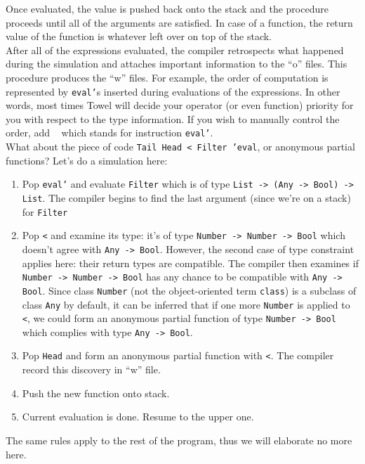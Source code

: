 \documentclass{article}
\begin{document}
Once evaluated, the value is pushed back onto the stack and the procedure proceeds until all of the arguments are satisfied. In case of a function, the return value of the function is whatever left over on top of the stack.\\

After all of the expressions evaluated, the compiler retrospects what happened during the simulation and attaches important information to the ``o'' files. This procedure produces the ``w'' files. For example, the order of computation is represented by \texttt{eval'}s inserted during evaluations of the expressions. In other words, most times Towel will decide your operator (or even function) priority for you with respect to the type information. If you wish to manually control the order, add \texttt{~} which stands for instruction \texttt{eval'}.\\

What about the piece of code \texttt{Tail Head < Filter 'eval}, or anonymous partial functions? Let's do a simulation here:

\begin{enumerate}
\item Pop \texttt{eval'} and evaluate \texttt{Filter} which is of type \texttt{List -> (Any -> Bool) -> List}. The compiler begins to find the last argument (since we're on a stack) for \texttt{Filter}
\item Pop \texttt{<} and examine its type: it's of type \texttt{Number -> Number -> Bool} which doesn't agree with \texttt{Any -> Bool}. However, the second case of type constraint applies here: their return types are compatible. The compiler then examines if \texttt{Number -> Number -> Bool} has any chance to be compatible with \texttt{Any -> Bool}. Since class \texttt{Number} (not the object-oriented term \texttt{class}) is a subclass of class \texttt{Any} by default, it can be inferred that if one more \texttt{Number} is applied to \texttt{<}, we could form an anonymous partial function of type \texttt{Number -> Bool} which complies with type \texttt{Any -> Bool}.
\item Pop \texttt{Head} and form an anonymous partial function with \texttt{<}. The compiler record this discovery in ``w'' file.
\item Push the new function onto stack.
\item Current evaluation is done. Resume to the upper one.
\end{enumerate}

The same rules apply to the rest of the program, thus we will elaborate no more here.\\
\end{document}
